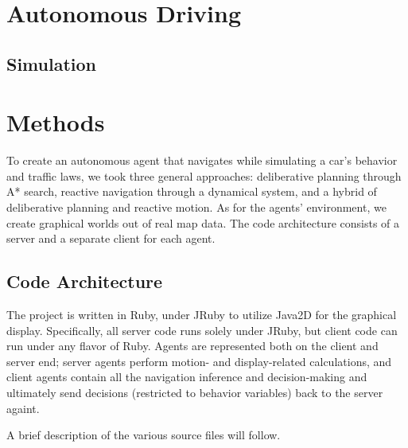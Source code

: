 \documentclass{article}
\begin{document}
\section{Autonomous Driving}

\subsection{Simulation}

\section{Methods}

To create an autonomous agent that navigates while simulating a car's behavior
and traffic laws, we took three general approaches: deliberative planning
through A* search, reactive navigation through a dynamical system, and a hybrid
of deliberative planning and reactive motion. As for the agents' environment, we
create graphical worlds out of real map data. The code architecture consists of
a server and a separate client for each agent.

\subsection{Code Architecture}

The project is written in Ruby, under JRuby to utilize Java2D for the graphical
display. Specifically, all server code runs solely under JRuby, but client
code can run under any flavor of Ruby. Agents are represented both on the client
and server end; server agents perform motion- and display-related
calculations, and client agents contain all the navigation inference and
decision-making and ultimately send decisions (restricted to behavior variables)
back to the server againt.

A brief description of the various source files will follow.
\end{document}
